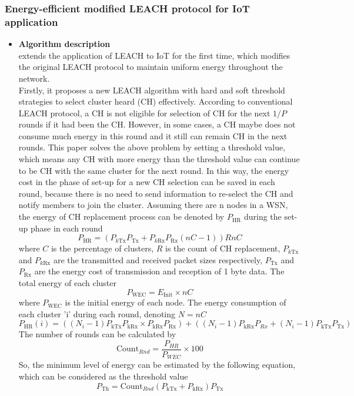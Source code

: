 \documentclass[11pt]{report}
\begin{document}
	\subsubsection{Energy-efficient modified LEACH protocol for IoT application}
	\begin{itemize}
		\item \textbf{Algorithm description}\\
			\noindent \cite{8465504} extends the application of LEACH to IoT for the first time, which modifies the original LEACH protocol to maintain uniform energy throughout the network.\\ Firstly, it proposes a new LEACH algorithm with hard and soft threshold strategies to select cluster heard (CH) effectively. According to conventional LEACH protocol, a CH is not eligible for selection of CH for the next $1/P$ rounds if it had been the CH. However, in some cases, a CH maybe does not consume much energy in this round and it still can remain CH in the next rounds. This paper solves the above problem by setting a threshold value, which means any CH with more energy than the threshold value can continue to be CH with the same cluster for the next round. In this way, the energy cost in the phase of set-up for a new CH selection can be saved in each round, because there is no need to send information to re-select the CH and notify members to join the cluster. Assuming there are n nodes in a WSN, the energy of CH replacement process can be denoted  by $P_\text{HR}$ during the set-up phase in each round
		\begin{equation}
		P_\text{HR} = \left(P_{k \text{Tx}}P_{\text{Tx}} + P_{k \text{Rx}}P_{\text{Rx}}\left(nC-1\right)\right)RnC
		\end{equation}
		where $C$ is the percentage of clusters, $R$ is the count of CH replacement, $P_{k\text{Tx}}$ and $P_{k\text{Rx}}$ are the transmitted and received packet sizes respectively, $P_{\text{Tx}}$ and $P_{\text{Rx}}$ are the energy cost of transmission and reception of 1 byte data. 
		The total energy of each cluster
		\begin{equation}
		P_{\text{WEC}} = E_{\text{Init}} \times nC
		\end{equation}
		where $P_{\text{WEC}}$ is the initial energy of each node.
		The energy consumption of each cluster 'i' during each round, denoting $N = nC$
		\begin{equation}
		P_{\text{HR}}\left(i\right) = \left(\left(N_i - 1\right)P_{\text{kTx}}P_{\text{kRx}} \times P_{\text{kRx}}P_{\text{Rx}}\right) + \left(\left(N_i-1\right)P_{\text{kRx}}P_{Rx} + \left(N_i-1\right)P_{\text{kTx}}P_{\text{Tx}}\right)
		\end{equation}
		The number of rounds can be calculated by
		\begin{equation}
		\text{Count}_{Rnd} = \frac{P_{HR}}{P_{WEC}} \times 100
		\end{equation}
		So, the minimum level of energy can be estimated by the following equation, which can be considered as the threshold value
		\begin{equation}
		P_{\text{Th}} = \text{Count}_{Rnd}\left(P_{\text{kTx}} + P_{\text{kRx}}\right)P_{\text{Tx}}
		\end{equation}
		

\end{itemize}
\end{document}

